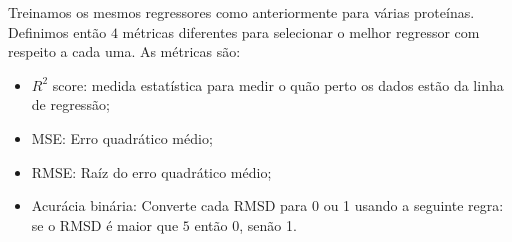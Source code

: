 \begin{table}[!htbp]
\begin{tabular}{@{}cccc@{}}
    \bottomrule
\end{tabular}
\end{table}

Treinamos os mesmos regressores como anteriormente para várias proteínas. Definimos então $4$ métricas diferentes
para selecionar o melhor regressor com respeito a cada uma. As métricas são:
\begin{itemize}
    \item $R^2$ score: medida estatística para medir o quão perto os dados estão da linha de regressão;
    \item MSE: Erro quadrático médio;
    \item RMSE: Raíz do erro quadrático médio;
    \item Acurácia binária: Converte cada RMSD para 0 ou 1 usando a seguinte regra: se o RMSD é maior que
          $5$ então 0, senão 1.
\end{itemize}

